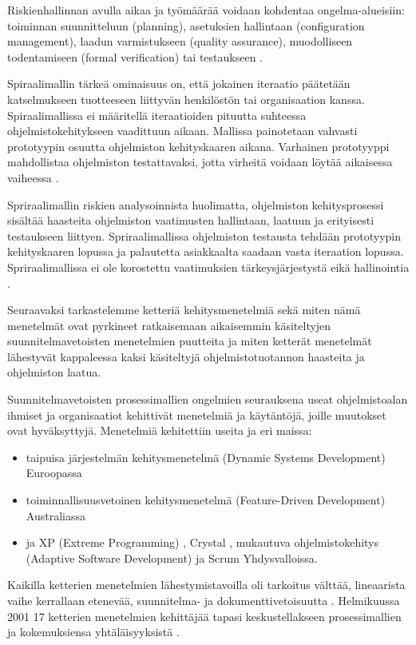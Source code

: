 \documentclass[finnish]{tktltiki2}
\theoremstyle{definition}
\theoremstyle{remark}
\begin{document}
Riskienhallinnan avulla aikaa ja työmäärää voidaan kohdentaa ongelma-alueisiin: toiminnan suunnitteluun (planning), asetuksien hallintaan (configuration management), laadun varmistukseen (quality assurance), muodolliseen todentamiseen (formal verification) tai testaukseen \cite{BOE88}.

Spiraalimallin tärkeä ominaisuus on, että jokainen iteraatio päätetään katselmukseen tuotteeseen liittyvän henkilöstön tai organisaation kanssa. Spiraalimallissa ei määritellä iteraatioiden pituutta suhteessa ohjelmistokehitykseen vaadittuun aikaan. Mallissa painotetaan vahvasti prototyypin osuutta ohjelmiston kehityskaaren aikana. Varhainen prototyyppi mahdollistaa ohjelmiston testattavaksi, jotta virheitä voidaan löytää aikaisessa vaiheessa \cite{BOE88}.

Spriraalimallin riskien analysoinnista huolimatta, ohjelmiston kehitysprosessi sisältää haasteita ohjelmiston vaatimusten hallintaan, laatuun ja erityisesti testaukseen liittyen. Spriraalimallissa ohjelmiston testausta tehdään prototyypin kehityskaaren lopussa ja palautetta asiakkaalta saadaan vasta iteraation lopussa. Spriraalimallissa ei ole korostettu vaatimuksien tärkeys\-järjestystä eikä hallinointia \cite{BOE88}.

Seuraavaksi tarkastelemme ketteriä kehitysmenetelmiä sekä miten nämä menetelmät ovat pyrkineet ratkaisemaan aikaisemmin käsiteltyjen suunnitelmavetoisten menetelmien puutteita ja miten ketterät menetelmät lähestyvät kappaleessa kaksi käsiteltyjä ohjelmistotuotannon haasteita ja ohjelmiston laatua.

Suunnitelmavetoisten prosessimallien ongelmien seurauksena useat ohjelmistoalan ihmiset ja organisaatiot kehittivät menetelmiä ja käytäntöjä, joille muutokset ovat hyväksyttyjä.
Menetelmiä kehitettiin useita ja eri maissa: \cite{WIC03}

\begin{itemize}
\item taipuisa järjestelmän kehitysmenetelmä (Dynamic Systems Development) Euroopassa
\item toiminnallisuusvetoinen kehitysmenetelmä (Feature-Driven Development) Australiassa
\item ja XP (Extreme Programming) \cite{BEC99}, Crystal \cite{COC05}, mukautuva ohjelmistokehitys (Adaptive Software Development) ja Scrum \cite{SCH09} Yhdysvalloissa.
\end{itemize}


Kaikilla ketterien menetelmien lähestymistavoilla oli tarkoitus välttää, lineaarista vaihe kerrallaan etenevää, suunnitelma- ja dokumenttivetoisuutta \cite{LAB03}.
Helmikuussa 2001 17 ketterien menetelmien kehittäjää tapasi keskustellakseen prosessimallien ja kokemuksiensa yhtäläisyyksistä  \cite{WIC03}.
\end{document}

